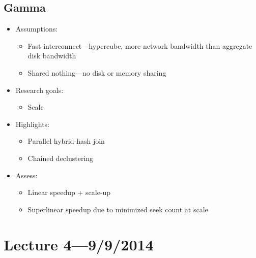 \documentclass[10pt]{article}
\begin{document}
\subsection{Gamma}

\begin{itemize}
\item Assumptions:
\begin{itemize}
\item Fast interconnect---hypercube, more network bandwidth than aggregate disk bandwidth
\item Shared nothing---no disk or memory sharing
\end{itemize}
\item Research goals:
\begin{itemize}
\item Scale
\end{itemize}
\item Highlights:
\begin{itemize}
\item Parallel hybrid-hash join
\item Chained declustering
\end{itemize}
\item Assess:
\begin{itemize}
\item Linear speedup + scale-up
\item Superlinear speedup due to minimized seek count at scale
\end{itemize}
\end{itemize}

\section{Lecture 4---9/9/2014}
\end{document}
